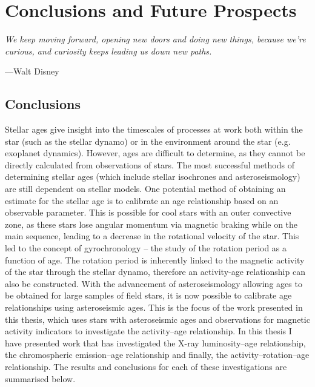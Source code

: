 
\chapter{Conclusions and Future Prospects} %

\label{Chapter6} %


\epigraph{\itshape We keep moving forward, opening new doors and doing new things, because we're curious, and curiosity keeps leading us down new paths.}{---Walt Disney}

\section{Conclusions}

Stellar ages give insight into the timescales of processes at work both within the star (such as the stellar dynamo) or in the environment around the star (e.g. exoplanet dynamics). However, ages are difficult to determine, as they cannot be directly calculated from observations of stars. The most successful methods of determining stellar ages (which include stellar isochrones and asteroseismology) are still dependent on stellar models. One potential method of obtaining an estimate for the stellar age is to calibrate an age relationship based on an observable parameter. This is possible for cool stars with an outer convective zone, as these stars lose angular momentum via magnetic braking while on the main sequence, leading to a decrease in the rotational velocity of the star. This led to the concept of gyrochronology -- the study of the rotation period as a function of age. The rotation period is inherently linked to the magnetic activity of the star through the stellar dynamo, therefore an activity-age relationship can also be constructed. With the advancement of asteroseismology allowing ages to be obtained for large samples of field stars, it is now possible to calibrate age relationships using asteroseismic ages. This is the focus of the work presented in this thesis, which uses stars with asteroseismic ages and observations for magnetic activity indicators to investigate the activity--age relationship. In this thesis I have presented work that has investigated the X-ray luminosity--age relationship, the chromospheric emission--age relationship and finally, the activity--rotation--age relationship. The results and conclusions for each of these investigations are summarised below.

